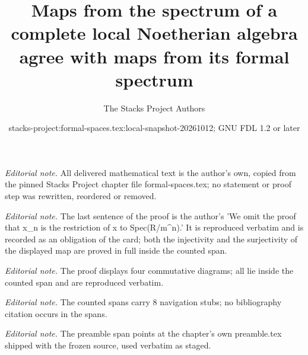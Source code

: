 \documentclass{stacks-project}
\title{Maps from the spectrum of a complete local Noetherian algebra agree with maps from its formal spectrum}
\author{The Stacks Project Authors}
\date{stacks-project:formal-spaces.tex:local-snapshot-20261012; GNU FDL 1.2 or later}
\theoremstyle{plain}
\theoremstyle{definition}
\theoremstyle{remark}
\numberwithin{equation}{subsection}
\begin{document}
\maketitle
\noindent\textit{Editorial note.} All delivered mathematical text is the author's own, copied from the pinned Stacks Project chapter file formal-spaces.tex; no statement or proof step was rewritten, reordered or removed.\par\medskip
\noindent\textit{Editorial note.} The last sentence of the proof is the author's 'We omit the proof that x\_n is the restriction of x to Spec(R/m\textasciicircum{}n).' It is reproduced verbatim and is recorded as an obligation of the card; both the injectivity and the surjectivity of the displayed map are proved in full inside the counted span.\par\medskip
\noindent\textit{Editorial note.} The proof displays four commutative diagrams; all lie inside the counted span and are reproduced verbatim.\par\medskip
\noindent\textit{Editorial note.} The counted spans carry 8 navigation stubs; no bibliography citation occurs in the spans.\par\medskip
\noindent\textit{Editorial note.} The preamble span points at the chapter's own preamble.tex shipped with the frozen source, used verbatim as staged.\par\medskip
\end{document}
